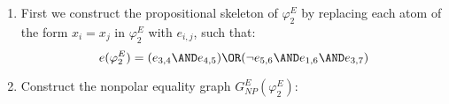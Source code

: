 {\begin{enumerate}
where $e(\varphi ^{E})$ denotes the \textit{propositional skeleton} of $%
\varphi ^{E}$and $B_{t}$ is a formula that describes the \textit{%
transitivity constraints} (conjunctions of implications).

So $\varphi ^{P}=e(\varphi ^{E})\AND B_{t}$ is equi-satisfiable to $\varphi
^{E}$, iff $\varphi ^{E}$ is satisfiable.

\bigskip
\item First we construct the propositional skeleton of $\varphi _{2}^{E}$ by
replacing each atom of the form $x_{i}=x_{j}$ in $\varphi _{2}^{E}$ with $%
e_{i,j}$, such that:%
\begin{equation*}
e(\varphi _{2}^{E})=(e_{3,4}\AND e_{4,5})\OR(\lnot e_{5,6}\AND e_{1,6} \AND 
e_{3,7})
\end{equation*}

\item Construct the nonpolar equality graph $G_{NP}^{E}(\varphi _{2}^{E})$:


\end{enumerate}}
